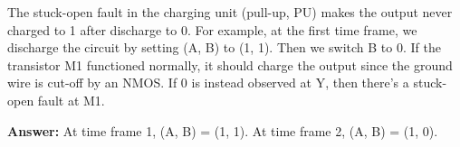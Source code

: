 The stuck-open fault in the charging unit (pull-up, PU) makes the output never charged to 1 after discharge to 0. For example, at the first time frame, we discharge the circuit by setting (A, B) to (1, 1). Then we switch B to 0. If the transistor M1 functioned normally, it should charge the output since the ground wire is cut-off by an NMOS. If 0 is instead observed at Y, then there's a stuck-open fault at M1.

\textbf{Answer:} At time frame 1, (A, B) = (1, 1). At time frame 2, (A, B) = (1, 0).
